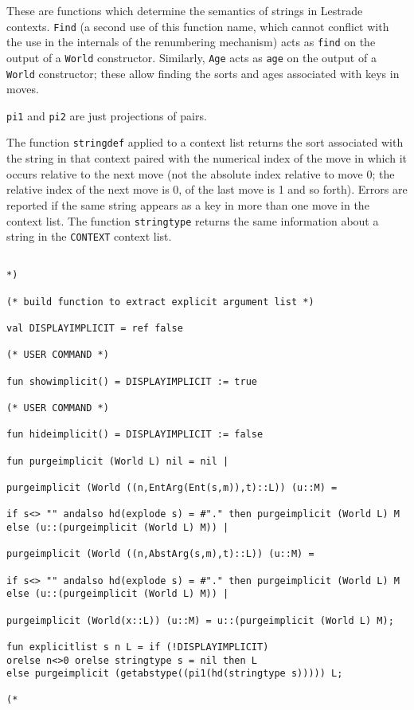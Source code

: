 \documentclass{article}
\begin{document}
These are functions which determine the semantics of strings in Lestrade contexts.  {\tt Find} (a second use of this function name, which cannot conflict with the use in the internals of the renumbering mechanism) acts as {\tt find} on the output of a {\tt World} constructor.  Similarly, {\tt Age} acts as {\tt age} on the output of a {\tt World} constructor; these allow finding the sorts and ages associated with keys in moves.

{\tt pi1} and {\tt pi2} are just projections of pairs.

The function {\tt stringdef} applied to a context list returns the sort associated with the string in that context paired with the numerical index of the move in which it occurs relative to the next move (not the absolute index relative to move 0; the relative index of the next move is 0, of the last move is 1 and so forth).  Errors are reported if the same string appears as a key in more than one move in the context list.   The function {\tt stringtype} returns the same information about a string in the {\tt CONTEXT} context list.



\begin{verbatim}

*)

(* build function to extract explicit argument list *)

val DISPLAYIMPLICIT = ref false

(* USER COMMAND *)

fun showimplicit() = DISPLAYIMPLICIT := true

(* USER COMMAND *)

fun hideimplicit() = DISPLAYIMPLICIT := false

fun purgeimplicit (World L) nil = nil |

purgeimplicit (World ((n,EntArg(Ent(s,m)),t)::L)) (u::M) =

if s<> "" andalso hd(explode s) = #"." then purgeimplicit (World L) M
else (u::(purgeimplicit (World L) M)) |

purgeimplicit (World ((n,AbstArg(s,m),t)::L)) (u::M) =

if s<> "" andalso hd(explode s) = #"." then purgeimplicit (World L) M
else (u::(purgeimplicit (World L) M)) |

purgeimplicit (World(x::L)) (u::M) = u::(purgeimplicit (World L) M);

fun explicitlist s n L = if (!DISPLAYIMPLICIT) 
orelse n<>0 orelse stringtype s = nil then L
else purgeimplicit (getabstype((pi1(hd(stringtype s))))) L;

(*

\end{verbatim}
\end{document}
